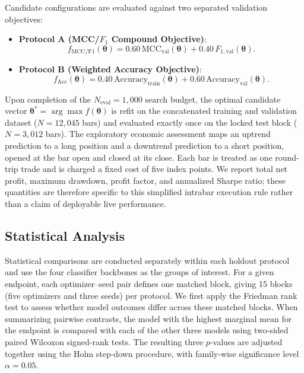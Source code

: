 Candidate configurations are evaluated against two separated validation objectives:
\begin{itemize}
    \item \textbf{Protocol A (MCC/$F_1$ Compound Objective)}:
    \begin{equation}\label{eq:fitness_protocol_a}
    f_{\mathrm{MCC/F1}}(\boldsymbol{\theta}) = 0.60\,\mathrm{MCC}_{\mathrm{val}}(\boldsymbol{\theta}) + 0.40\,F_{1,\mathrm{val}}(\boldsymbol{\theta}).
    \end{equation}
    \item \textbf{Protocol B (Weighted Accuracy Objective)}:
    \begin{equation}\label{eq:fitness_protocol_b}
    f_{\mathrm{Acc}}(\boldsymbol{\theta}) = 0.40\,\mathrm{Accuracy}_{\mathrm{train}}(\boldsymbol{\theta}) + 0.60\,\mathrm{Accuracy}_{\mathrm{val}}(\boldsymbol{\theta}).
    \end{equation}
\end{itemize}

Upon completion of the $N_{\mathrm{eval}} = 1{,}000$ search budget, the optimal candidate vector $\boldsymbol{\theta}^* = \arg\max f(\boldsymbol{\theta})$ is refit on the concatenated training and validation dataset ($N = 12{,}045$ bars) and evaluated exactly once on the locked test block ($N = 3{,}012$ bars). The exploratory economic assessment maps an uptrend prediction to a long position and a downtrend prediction to a short position, opened at the bar open and closed at its close. Each bar is treated as one round-trip trade and is charged a fixed cost of five index points. We report total net profit, maximum drawdown, profit factor, and annualized Sharpe ratio; these quantities are therefore specific to this simplified intrabar execution rule rather than a claim of deployable live performance.

\subsection{Statistical Analysis}
\label{sec:statistical_analysis}

Statistical comparisons are conducted separately within each holdout protocol and use the four classifier backbones as the groups of interest. For a given endpoint, each optimizer--seed pair defines one matched block, giving 15 blocks (five optimizers and three seeds) per protocol. We first apply the Friedman rank test to assess whether model outcomes differ across these matched blocks. When summarizing pairwise contrasts, the model with the highest marginal mean for the endpoint is compared with each of the other three models using two-sided paired Wilcoxon signed-rank tests. The resulting three $p$-values are adjusted together using the Holm step-down procedure, with family-wise significance level $\alpha=0.05$.

